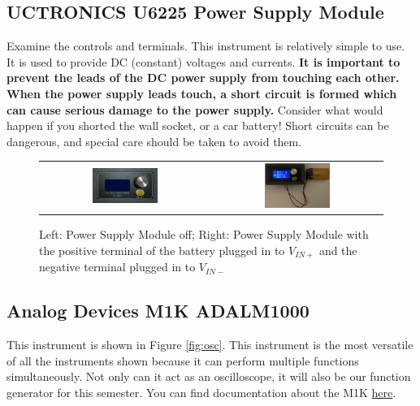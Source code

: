 \documentclass[12pt]{../manual}
\begin{document}
\subsection{UCTRONICS U6225 Power Supply Module}
Examine the controls and terminals. This instrument is relatively simple to use. It is used to provide DC (constant) voltages and currents. \textbf{It is important to prevent the leads of the DC power supply from touching each other. When the power supply leads touch, a short circuit is formed which can cause serious damage to the power supply.} Consider what would happen if you shorted the wall socket, or a car battery! Short circuits can be dangerous, and special care should be taken to avoid them.

\begin{figure}[ht!]
\centering
\begin{tabular}{cc}
\includegraphics[width=0.4\textwidth]{figures/powerConverterModuleOff.png} & 
\includegraphics[width=0.4\textwidth]{figures/powerConverterModule.png}
\end{tabular}
\caption[UCTRONICS U6225 Power Supply Module]{Left: Power Supply Module off; Right: Power Supply Module with the positive terminal of the battery plugged in to $V_{IN+}$ and the negative terminal plugged in to $V_{IN-}$}
\label{fig:powerSupply}
\end{figure}

\subsection{Analog Devices M1K ADALM1000}
This instrument is shown in Figure \ref{fig:osc}. This instrument is the most versatile of all the instruments shown because it can perform multiple functions simultaneously. Not only can it act as an oscilloscope, it will also be our function generator for this semester. You can find documentation about the M1K \href{https://wiki.analog.com/university/tools/m1k}{here}.
\end{document}
